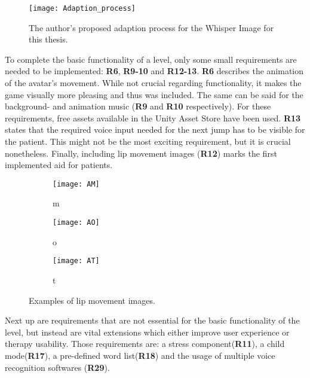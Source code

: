 \documentclass[draft,final]{vutinfth} %
\begin{document}
\begin{figure}
\begin{center}
\texttt{[image: Adaption\_process]}
\end{center}
\caption{The author's proposed adaption process for the Whisper Image for this thesis.}
\end{figure}

 
To complete the basic functionality of a level, only some small requirements are needed to be implemented: \textbf{R6}, \textbf{R9-10} and \textbf{R12-13}. \textbf{R6} describes the animation of the avatar's movement. While not crucial regarding functionality, it makes the game visually more pleasing and thus was included. The same can be said for the background- and animation music (\textbf{R9} and \textbf{R10} respectively). For these requirements, free assets available in the Unity Asset Store \cite{unityStore} have been used. \textbf{R13} states that the required voice input needed for the next jump has to be visible for the patient. This might not be the most exciting requirement, but it is crucial nonetheless. Finally, including lip movement images (\textbf{R12}) marks the first implemented aid for patients. 
\begin{figure}
\begin{subfigure}{.33\textwidth}
  \centering
  \texttt{[image: AM]}
  \caption{m}
\end{subfigure}%
\begin{subfigure}{.33\textwidth}
  \centering
  \texttt{[image: AO]}
  \caption{o}
\end{subfigure}
\begin{subfigure}{.33\textwidth}
  \centering
  \texttt{[image: AT]}
  \caption{t}
\end{subfigure}
\caption{Examples of lip movement images\cite{lipImages}. }
\end{figure}

Next up are requirements that are not essential for the basic functionality of the level, but instead are vital extensions which either improve user experience or therapy usability. Those requirements are: a stress component(\textbf{R11}), a child mode(\textbf{R17}), a pre-defined word list(\textbf{R18}) and the usage of multiple voice recognition softwares (\textbf{R29}).
\end{document}
